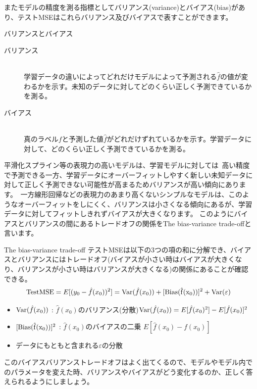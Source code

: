 \documentclass[uplatex]{jsarticle}
\begin{document}
またモデルの精度を測る指標としてバリアンス(variance)とバイアス(bias)があり、テストMSEはこれらバリアンス及びバイアスで表すことができます。
\begin{itembox}[l]{バリアンスとバイアス}
  \begin{description}
    \item [バリアンス]\mbox{}\\
    学習データの違いによってどれだけモデルによって予測される$\hat{f}$の値が変わるかを示す。未知のデータに対してどのくらい正しく予測できているかを測る。
    \item [バイアス]\mbox{}\\
    真のラベル$f$と予測した値$\hat{f}$がどれだけずれているかを示す。学習データに対して、どのくらい正しく予測できているかを測る。
  \end{description}
\end{itembox}
平滑化スプライン等の表現力の高いモデルは、学習モデルに対しては\
高い精度で予測できる一方、学習データにオーバーフィットしやすく新しい未知データに対して正しく予測できない可能性が高まるためバリアンスが高い傾向にあります。\
一方線形回帰などの表現力のあまり高くないシンプルなモデルは、このようなオーバーフィットをしにくく、バリアンスは小さくなる傾向にあるが、学習データに対してフィットしきれずバイアスが大きくなります。
このようにバイアスとバリアンスの間にあるトレードオフの関係をThe bias-variance trade-offと言います。
\begin{itembox}[l]{The bias-variance trade-off}
  テストMSEは以下の3つの項の和に分解でき、バイアスとバリアンスにはトレードオフ(バイアスが小さい時はバイアスが大きくなり、バリアンスが小さい時はバリアンスが大きくなる)の関係にあることが確認できる。
  $${\rm Test MSE} = E[(y_0 - \hat{f}(x_0))^2] = {\rm Var}(\hat{f}(x_0)) + [{\rm Bias (\hat{f}(x_0))}]^2 + {\rm Var}(\varepsilon)$$
  \begin{itemize}
    \item  ${\rm Var}(\hat{f}(x_0))$ : $\hat{f}(x_0)$のバリアンス(分散)${\rm Var}(\hat{f}(x_0)) = E[\hat{f}(x_0)^2] - E[\hat{f}(x_0)]^2$
    \item $[{\rm Bias (\hat{f}(x_0))}]^2$ :  $\hat{f}(x_0)$のバイアスの二乗 $E[\hat{f}(x_0) - f(x_0)]$
    \item データにもともと含まれる$\varepsilon$の分散
  \end{itemize}
\end{itembox}
このバイアスバリアンストレードオフはよく出てくるので、モデルやモデル内でのパラメータを変えた時、バリアンスやバイアスがどう変化するのか、正しく答えられるようにしましょう。
\end{document}
